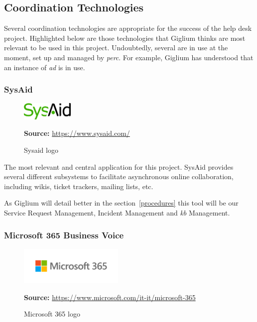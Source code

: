 \subsection{Coordination Technologies}
Several coordination technologies are appropriate for the success of the help desk
project. Highlighted below are those technologies that Giglium thinks are most relevant to be used in
this project. Undoubtedly, several are in use at the moment, set up and managed by \textit{\gls{perc}}.
For example, Giglium has understood that an instance of \textit{\gls{ad}} is in use.

\subsubsection{SysAid}

\begin{figure}[ht!]
	\centering
	\includegraphics[width=25mm]{./img/project/sysaid.png}
	\caption{Sysaid logo}\label{fig:sysaid-logo}
	\textbf{Source:} \url{https://www.sysaid.com/}
\end{figure}

The most relevant and central application for this project. SysAid\cite{sysaid} provides several different subsystems to facilitate asynchronous online collaboration, including wikis, ticket trackers, mailing lists, etc.

As Giglium will detail better in the section~\ref{procedures} this tool will be our Service Request Management, Incident Management and \textit{\gls{kb}} Management.

\subsubsection{Microsoft 365 Business Voice}

\begin{figure}[ht!]
	\centering
	\includegraphics[width=50mm]{./img/project/microsoft-365.png}
	\caption{Microsoft 365 logo}\label{fig:microsoft-365}
	\textbf{Source:} \url{https://www.microsoft.com/it-it/microsoft-365}
\end{figure}

